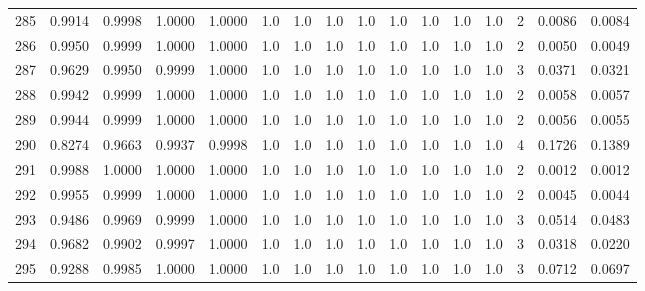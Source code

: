 \begin{tabular}{lrrrrrrrrrrrrrrr}
285 &      0.9914 &  0.9998 &  1.0000 &  1.0000 &     1.0 &     1.0 &     1.0 &     1.0 &     1.0 &     1.0 &      1.0 &        1.0 &      2 &                    0.0086 &                     0.0084 \\
286 &      0.9950 &  0.9999 &  1.0000 &  1.0000 &     1.0 &     1.0 &     1.0 &     1.0 &     1.0 &     1.0 &      1.0 &        1.0 &      2 &                    0.0050 &                     0.0049 \\
287 &      0.9629 &  0.9950 &  0.9999 &  1.0000 &     1.0 &     1.0 &     1.0 &     1.0 &     1.0 &     1.0 &      1.0 &        1.0 &      3 &                    0.0371 &                     0.0321 \\
288 &      0.9942 &  0.9999 &  1.0000 &  1.0000 &     1.0 &     1.0 &     1.0 &     1.0 &     1.0 &     1.0 &      1.0 &        1.0 &      2 &                    0.0058 &                     0.0057 \\
289 &      0.9944 &  0.9999 &  1.0000 &  1.0000 &     1.0 &     1.0 &     1.0 &     1.0 &     1.0 &     1.0 &      1.0 &        1.0 &      2 &                    0.0056 &                     0.0055 \\
290 &      0.8274 &  0.9663 &  0.9937 &  0.9998 &     1.0 &     1.0 &     1.0 &     1.0 &     1.0 &     1.0 &      1.0 &        1.0 &      4 &                    0.1726 &                     0.1389 \\
291 &      0.9988 &  1.0000 &  1.0000 &  1.0000 &     1.0 &     1.0 &     1.0 &     1.0 &     1.0 &     1.0 &      1.0 &        1.0 &      2 &                    0.0012 &                     0.0012 \\
292 &      0.9955 &  0.9999 &  1.0000 &  1.0000 &     1.0 &     1.0 &     1.0 &     1.0 &     1.0 &     1.0 &      1.0 &        1.0 &      2 &                    0.0045 &                     0.0044 \\
293 &      0.9486 &  0.9969 &  0.9999 &  1.0000 &     1.0 &     1.0 &     1.0 &     1.0 &     1.0 &     1.0 &      1.0 &        1.0 &      3 &                    0.0514 &                     0.0483 \\
294 &      0.9682 &  0.9902 &  0.9997 &  1.0000 &     1.0 &     1.0 &     1.0 &     1.0 &     1.0 &     1.0 &      1.0 &        1.0 &      3 &                    0.0318 &                     0.0220 \\
295 &      0.9288 &  0.9985 &  1.0000 &  1.0000 &     1.0 &     1.0 &     1.0 &     1.0 &     1.0 &     1.0 &      1.0 &        1.0 &      3 &                    0.0712 &                     0.0697 \\

\end{tabular}
